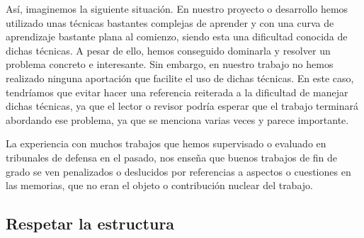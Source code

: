 Así, imaginemos la siguiente situación. En nuestro proyecto o desarrollo hemos utilizado unas técnicas bastantes complejas de aprender y con una curva de aprendizaje bastante plana al comienzo, siendo esta una dificultad conocida de dichas técnicas. A pesar de ello, hemos conseguido dominarla y resolver un problema concreto e interesante. Sin embargo, en nuestro trabajo no hemos realizado ninguna aportación que facilite el uso de dichas técnicas. En este caso, tendríamos que evitar hacer una referencia reiterada a la dificultad de manejar dichas técnicas, ya que el lector o revisor podría esperar que el trabajo terminará abordando ese problema, ya que se menciona varias veces y parece importante.


La experiencia con muchos trabajos que hemos supervisado o evaluado en tribunales de defensa en el pasado, nos enseña que buenos trabajos de fin de grado se ven penalizados o deslucidos por referencias a aspectos o cuestiones en las memorias, que no eran el objeto o contribución nuclear del trabajo.

\subsection{Respetar la estructura}


